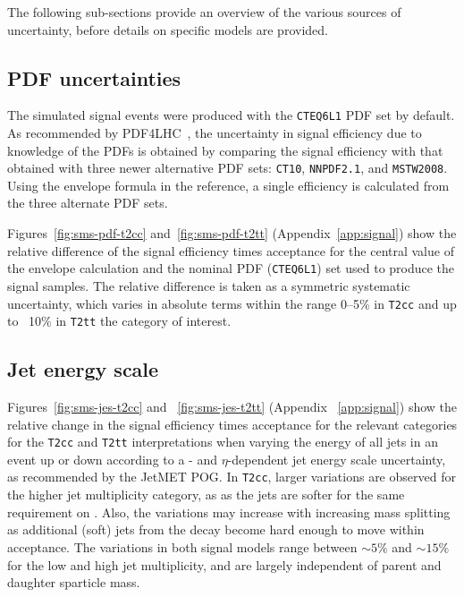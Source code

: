 The following sub-sections provide an overview of the various sources of
uncertainty, before details on specific models are provided. 

\subsection{PDF uncertainties\label{sec:pdf-sets}}

The simulated signal events were produced with the \verb!CTEQ6L1! PDF
set by default.  As recommended by PDF4LHC~\cite{pdf4lhc}, the uncertainty
in signal efficiency due to knowledge of the PDFs is obtained by comparing 
the signal efficiency with that obtained with three newer alternative PDF 
sets: \verb!CT10!, \verb!NNPDF2.1!, and \verb!MSTW2008!. Using the envelope
formula in the reference, a single efficiency is calculated from the three alternate
PDF sets. 

Figures~\ref{fig:sms-pdf-t2cc} and~\ref{fig:sms-pdf-t2tt} 
(Appendix~\ref{app:signal}) show the relative difference of the signal 
efficiency times acceptance for the central value of the envelope calculation 
and the nominal PDF (\verb!CTEQ6L1!) set used to produce the signal 
samples. The relative difference is taken as a symmetric systematic 
uncertainty, which varies in absolute terms within the range 0--5\% in 
\verb!T2cc! and up to ~10\% in \verb!T2tt! the category of interest.


\subsection{Jet energy scale\label{sec:sms-syst-jes}}

Figures~\ref{fig:sms-jes-t2cc} and ~\ref{fig:sms-jes-t2tt} 
(Appendix ~\ref{app:signal}) show the relative change in the 
signal efficiency times acceptance for the relevant categories for 
the \verb!T2cc! and \verb!T2tt! interpretations when varying the energy 
of all jets in an event up or down according to a \pt- and $\eta$-dependent 
jet energy scale uncertainty, as recommended by the JetMET POG. 
In \verb!T2cc!, larger variations are observed for the higher 
jet multiplicity category, as as the jets are softer for the same 
requirement on \scalht. Also, the variations may increase with 
increasing mass splitting as additional (soft) jets from the decay 
become hard enough to move within acceptance. The variations in both 
signal models range between $\sim5\%$ and $\sim15\%$ for the low 
and high jet multiplicity, and are largely independent of parent 
and daughter sparticle mass. 

